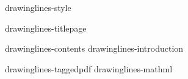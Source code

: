 
\environment drawinglines-style

\startdocument

    \component drawinglines-titlepage

    \startfrontmatter
        \component drawinglines-contents
        \component drawinglines-introduction
    \stopfrontmatter

    \startbodymatter
        \component drawinglines-taggedpdf
        \component drawinglines-mathml
    \stopbodymatter

\stopdocument

